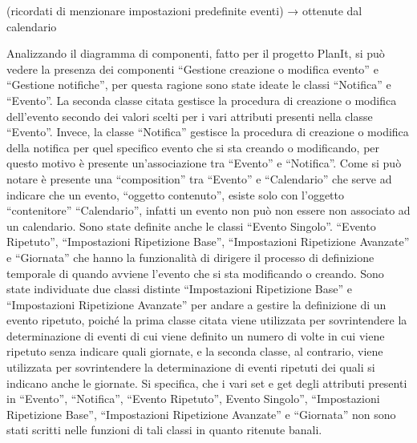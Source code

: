 \begin{listaPersonale}[DCL]{}
\begin{listaPersonale2}[DCL]{}

        (ricordati di menzionare impostazioni predefinite eventi) → ottenute dal calendario

        Analizzando il diagramma di componenti, fatto per il progetto PlanIt, si può vedere la presenza dei componenti “Gestione creazione o modifica evento” e “Gestione notifiche”, per questa ragione sono state ideate le classi “Notifica” e “Evento”. La seconda classe citata gestisce la procedura di creazione o modifica dell'evento secondo dei valori scelti per i vari attributi presenti nella classe “Evento”. Invece, la classe “Notifica” gestisce la procedura di creazione o modifica della notifica per quel specifico evento che si sta creando o modificando, per questo motivo è presente un'associazione tra “Evento” e “Notifica”.
        Come si può notare è presente una “composition” tra “Evento” e “Calendario” che serve ad indicare che un evento, “oggetto contenuto”, esiste solo con l'oggetto “contenitore” “Calendario”, infatti un evento non può non essere non associato ad un calendario.
        Sono state definite anche le classi “Evento Singolo”. “Evento Ripetuto”, “Impostazioni Ripetizione Base”, “Impostazioni Ripetizione Avanzate” e “Giornata” che hanno la funzionalità di dirigere il processo di definizione temporale di quando avviene l'evento che si sta modificando o creando. Sono state individuate due classi distinte “Impostazioni Ripetizione Base” e “Impostazioni Ripetizione Avanzate” per andare a gestire la definizione di un evento ripetuto, poiché la prima classe citata viene utilizzata per sovrintendere la determinazione di eventi di cui viene definito un numero di volte in cui viene ripetuto senza indicare quali giornate, e la seconda classe, al contrario, viene utilizzata per sovrintendere la determinazione di eventi ripetuti dei quali si indicano anche le giornate.
        Si specifica, che i vari set e get degli attributi presenti in “Evento”, “Notifica”, “Evento Ripetuto”, Evento Singolo”, “Impostazioni Ripetizione Base”, “Impostazioni Ripetizione Avanzate” e “Giornata” non sono stati scritti nelle funzioni di tali classi in quanto ritenute banali.




\end{listaPersonale2}
\end{listaPersonale}
